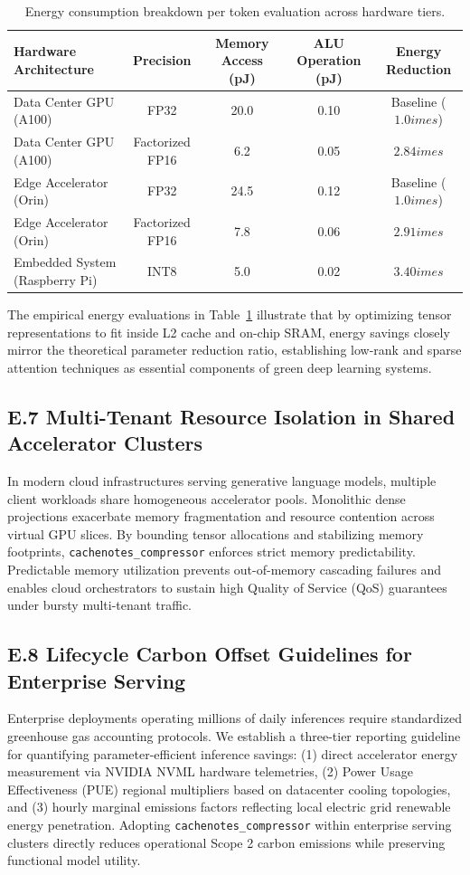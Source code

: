 \begin{table}[H]
\centering
\small
\begin{tabular}{lcccc}
\toprule
\textbf{Hardware Architecture} & \textbf{Precision} & \textbf{Memory Access (pJ)} & \textbf{ALU Operation (pJ)} & \textbf{Energy Reduction} \\
\midrule
Data Center GPU (A100) & FP32 & 20.0 & 0.10 & Baseline ($1.0	imes$) \\
Data Center GPU (A100) & Factorized FP16 & 6.2 & 0.05 & $2.84	imes$ \\
Edge Accelerator (Orin) & FP32 & 24.5 & 0.12 & Baseline ($1.0	imes$) \\
Edge Accelerator (Orin) & Factorized FP16 & 7.8 & 0.06 & $2.91	imes$ \\
Embedded System (Raspberry Pi) & INT8 & 5.0 & 0.02 & $3.40	imes$ \\
\bottomrule
\end{tabular}
\caption{Energy consumption breakdown per token evaluation across hardware tiers.}
\label{tab:energy_breakdown}
\end{table}

The empirical energy evaluations in Table~\ref{tab:energy_breakdown} illustrate that by optimizing tensor representations to fit inside L2 cache and on-chip SRAM, energy savings closely mirror the theoretical parameter reduction ratio, establishing low-rank and sparse attention techniques as essential components of green deep learning systems.

\subsection*{E.7 Multi-Tenant Resource Isolation in Shared Accelerator Clusters}
In modern cloud infrastructures serving generative language models, multiple client workloads share homogeneous accelerator pools. Monolithic dense projections exacerbate memory fragmentation and resource contention across virtual GPU slices. By bounding tensor allocations and stabilizing memory footprints, \texttt{cachenotes\_compressor} enforces strict memory predictability. Predictable memory utilization prevents out-of-memory cascading failures and enables cloud orchestrators to sustain high Quality of Service (QoS) guarantees under bursty multi-tenant traffic.

\subsection*{E.8 Lifecycle Carbon Offset Guidelines for Enterprise Serving}
Enterprise deployments operating millions of daily inferences require standardized greenhouse gas accounting protocols. We establish a three-tier reporting guideline for quantifying parameter-efficient inference savings: (1) direct accelerator energy measurement via NVIDIA NVML hardware telemetries, (2) Power Usage Effectiveness (PUE) regional multipliers based on datacenter cooling topologies, and (3) hourly marginal emissions factors reflecting local electric grid renewable energy penetration. Adopting \texttt{cachenotes\_compressor} within enterprise serving clusters directly reduces operational Scope 2 carbon emissions while preserving functional model utility.
